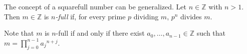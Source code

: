 \documentclass[12pt]{article}
\begin{document}
The concept of a squarefull number can be generalized.  Let $n \in \mathbb{Z}$ with $n>1$.  Then $m \in \mathbb{Z}$ is {\sl $n$-full\/} if, for every prime $p$ dividing $m$, $p^n$ divides $m$.

Note that $m$ is $n$-full if and only if there exist $a_0, \dots, a_{n-1} \in \mathbb{Z}$ such that $\displaystyle m=\prod_{j=0}^{n-1} {a_j}^{n+j}$.
\end{document}
